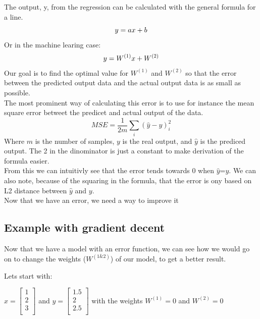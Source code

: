 	The output, y, from the regression can be calculated with the general formula for a line.
	\begin{equation}
	  y=ax+b\\
	\end{equation}
	Or in the machine learing case:\\
	\begin{equation}
	  y=W^{(1)}x+W^{(2)}\\
	\end{equation}
	Our goal is to find the optimal value for $W^{(1)}$ and $W^{(2)}$ so that the error between the predicted output data and the 
	actual output data is as small as possible.\\
	
	The most prominent way of calculating this error is to use for instance the mean square error betweet the predicet and actual output of the data. 
	\begin{equation}\label{MSE_form}
	 MSE=\frac{1}{2m} \sum_i (\hat{y}-y)_i^2
	\end{equation}
	Where $m$ is the number of samples, $y$ is the real output, and $\hat{y}$ is the prediced output. The 2 in the dinominator is just a constant
	to make derivation of the formula easier.\\
	
	From this we can intuitivly see that the error tends towards 0 when $\hat{y}$=$y$. We can also note, because of the 
	squaring in the formula, that the error is ony based on L2 distance between $\hat{y}$ and $y$.\\
	
	\vspace{10mm}
	Now that we have an error, we need a way to improve it 
	
	\subsection{Example with gradient decent}
	Now that we have a model with an error function, we can see how we would go on to change the weights ($W^{(1\&2)}$) 
	of our model, to get a better result. 
	
	Lets start with: 
	
	$x=\left[ \begin{array}{c} 1\\ 2\\ 3\\ \end{array} \right]$ 
	and 
	$y=\left[\begin{array}{c} 1.5\\2\\ 2.5\\\end{array}\right]$
	with the weights $W^{(1)}=0$ and $W^{(2)}=0$
	
